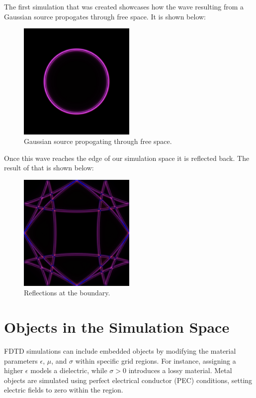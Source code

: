 \documentclass[12pt]{article}
\begin{document}
\begin{spacing}{1.5}
The first simulation that was created showcases how the wave resulting from a Gaussian source propogates through free space. It is shown below:

\begin{figure}[h!]
    \centering
    \includegraphics[width=0.5\textwidth]{sim0}
    \caption{Gaussian source propogating through free space.}
    \label{fig:sim0}
\end{figure}

\FloatBarrier

Once this wave reaches the edge of our simulation space it is reflected back. The result of that is shown below:

\begin{figure}[h!]
    \centering
    \includegraphics[width=0.5\textwidth]{sim1}
    \caption{Reflections at the boundary.}
    \label{fig:sim1}
\end{figure}

\FloatBarrier

\section{Objects in the Simulation Space}
FDTD simulations can include embedded objects by modifying the material parameters $\epsilon$, $\mu$, and $\sigma$ within specific grid regions. For instance, assigning a higher $\epsilon$ models a dielectric, while $\sigma > 0$ introduces a lossy material. Metal objects are simulated using perfect electrical conductor (PEC) conditions, setting electric fields to zero within the region.


\end{spacing}
\end{document}
